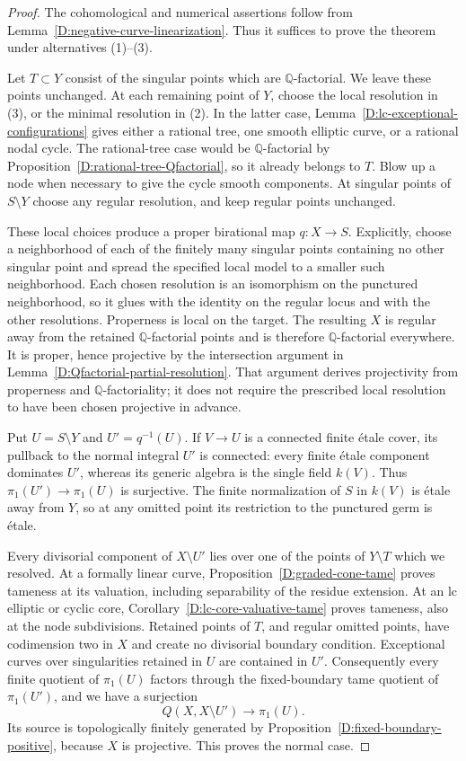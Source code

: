 \begin{proof}
The cohomological and numerical assertions follow from
Lemma~\ref{D:negative-curve-linearization}.  Thus it suffices
to prove the theorem under alternatives (1)--(3).

Let $T\subset Y$ consist of the singular points which are
$\mathbb Q$-factorial.  We leave these points unchanged.  At
each remaining point of $Y$, choose the local resolution in
(3), or the minimal resolution in (2).  In the latter case,
Lemma~\ref{D:lc-exceptional-configurations} gives either a
rational tree, one smooth elliptic curve, or a rational nodal
cycle.  The rational-tree case would be $\mathbb Q$-factorial
by Proposition~\ref{D:rational-tree-Qfactorial}, so it already
belongs to $T$.  Blow up a node when necessary to give the
cycle smooth components.  At singular points of $S\setminus Y$
choose any regular resolution, and keep regular points
unchanged.

These local choices produce a proper birational map
$q:X\to S$.  Explicitly, choose a neighborhood of each of the
finitely many singular points containing no other singular
point and spread the specified local model to a smaller such
neighborhood.  Each chosen resolution is an isomorphism on
the punctured neighborhood, so it glues with the identity on
the regular locus and with the other resolutions.  Properness
is local on the target.  The resulting $X$ is regular away
from the retained $\mathbb Q$-factorial points and is therefore
$\mathbb Q$-factorial everywhere.  It is proper, hence
projective by the intersection argument in
Lemma~\ref{D:Qfactorial-partial-resolution}.  That argument
derives projectivity from properness and $\mathbb Q$-factoriality;
it does not require the prescribed local resolution to have
been chosen projective in advance.

Put $U=S\setminus Y$ and $U'=q^{-1}(U)$.  If $V\to U$ is a
connected finite \'etale cover, its pullback to the normal
integral $U'$ is connected: every finite \'etale component
dominates $U'$, whereas its generic algebra is the single
field $k(V)$.  Thus $\pi_1(U')\to\pi_1(U)$ is surjective.
The finite normalization of $S$ in $k(V)$ is \'etale away from
$Y$, so at any omitted point its restriction to the punctured
germ is \'etale.

Every divisorial component of $X\setminus U'$ lies over one
of the points of $Y\setminus T$ which we resolved.  At a
formally linear curve, Proposition~\ref{D:graded-cone-tame}
proves tameness at its valuation, including separability of
the residue extension.  At an lc elliptic or cyclic core,
Corollary~\ref{D:lc-core-valuative-tame} proves tameness, also at
the node subdivisions.  Retained points of $T$, and regular
omitted points, have codimension two in $X$ and create no
divisorial boundary condition.  Exceptional curves over
singularities retained in $U$ are contained in $U'$.
Consequently every finite quotient of $\pi_1(U)$ factors
through the fixed-boundary tame quotient of $\pi_1(U')$, and
we have a surjection
\[
                  Q(X,X\setminus U')\longrightarrow\pi_1(U).
\]
Its source is topologically finitely generated by
Proposition~\ref{D:fixed-boundary-positive}, because $X$ is
projective.  This proves the normal case.


\end{proof}
